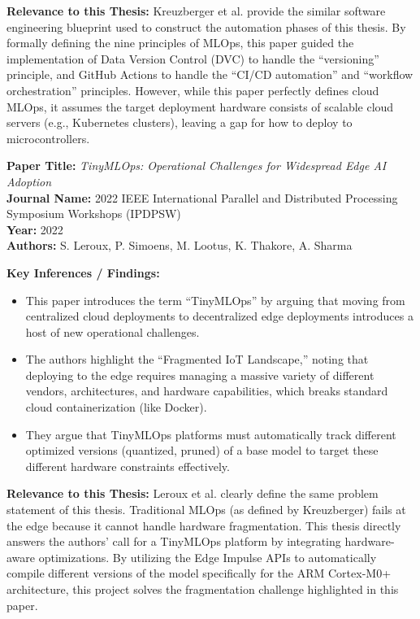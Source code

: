 \documentclass[11pt,a4paper,openany]{book}
\begin{document}
\vspace{0.5em}
\noindent\textbf{Relevance to this Thesis:} Kreuzberger et al. provide the similar software engineering blueprint used to construct the automation phases of this thesis. By formally defining the nine principles of MLOps, this paper guided the implementation of Data Version Control (DVC) to handle the ``versioning'' principle, and GitHub Actions to handle the ``CI/CD automation'' and ``workflow orchestration'' principles. However, while this paper perfectly defines cloud MLOps, it assumes the target deployment hardware consists of scalable cloud servers (e.g., Kubernetes clusters), leaving a gap for how to deploy to microcontrollers.

\vspace{2em}
\noindent\textbf{Paper Title:} \textit{TinyMLOps: Operational Challenges for Widespread Edge AI Adoption} \cite{15}\\
\textbf{Journal Name:} 2022 IEEE International Parallel and Distributed Processing Symposium Workshops (IPDPSW)\\
\textbf{Year:} 2022\\
\textbf{Authors:} S. Leroux, P. Simoens, M. Lootus, K. Thakore, A. Sharma

\vspace{0.5em}
\noindent\textbf{Key Inferences / Findings:}
\begin{itemize}
    \item This paper introduces the term ``TinyMLOps'' by arguing that moving from centralized cloud deployments to decentralized edge deployments introduces a host of new operational challenges.
    \item The authors highlight the ``Fragmented IoT Landscape,'' noting that deploying to the edge requires managing a massive variety of different vendors, architectures, and hardware capabilities, which breaks standard cloud containerization (like Docker).
    \item They argue that TinyMLOps platforms must automatically track different optimized versions (quantized, pruned) of a base model to target these different hardware constraints effectively.
\end{itemize}

\vspace{0.5em}
\noindent\textbf{Relevance to this Thesis:} Leroux et al. clearly define the same problem statement of this thesis. Traditional MLOps (as defined by Kreuzberger) fails at the edge because it cannot handle hardware fragmentation. This thesis directly answers the authors' call for a TinyMLOps platform by integrating hardware-aware optimizations. By utilizing the Edge Impulse APIs to automatically compile different versions of the model specifically for the ARM Cortex-M0+ architecture, this project solves the fragmentation challenge highlighted in this paper.
\end{document}
